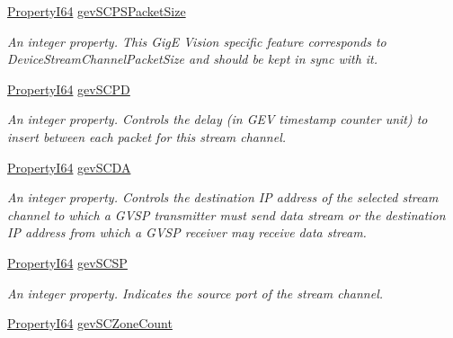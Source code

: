 \begin{DoxyCompactItemize}
\hyperlink{group___common_interface_ga81749b2696755513663492664a18a893}{Property\+I64} \hyperlink{classmv_i_m_p_a_c_t_1_1acquire_1_1_gen_i_cam_1_1_transport_layer_control_a9aaa69a850d9a3a92fd5d59ef48239af}{gev\+S\+C\+P\+S\+Packet\+Size}
\begin{DoxyCompactList}\small\item\em An integer property. This Gig\+E Vision specific feature corresponds to Device\+Stream\+Channel\+Packet\+Size and should be kept in sync with it. \end{DoxyCompactList}\item 
\hyperlink{group___common_interface_ga81749b2696755513663492664a18a893}{Property\+I64} \hyperlink{classmv_i_m_p_a_c_t_1_1acquire_1_1_gen_i_cam_1_1_transport_layer_control_a9364b85c25a2b2bb7f9e56a3076ee1be}{gev\+S\+C\+P\+D}
\begin{DoxyCompactList}\small\item\em An integer property. Controls the delay (in G\+E\+V timestamp counter unit) to insert between each packet for this stream channel. \end{DoxyCompactList}\item 
\hyperlink{group___common_interface_ga81749b2696755513663492664a18a893}{Property\+I64} \hyperlink{classmv_i_m_p_a_c_t_1_1acquire_1_1_gen_i_cam_1_1_transport_layer_control_a06a3fafd41f32d5d6c1d84aeecee87ea}{gev\+S\+C\+D\+A}
\begin{DoxyCompactList}\small\item\em An integer property. Controls the destination I\+P address of the selected stream channel to which a G\+V\+S\+P transmitter must send data stream or the destination I\+P address from which a G\+V\+S\+P receiver may receive data stream. \end{DoxyCompactList}\item 
\hyperlink{group___common_interface_ga81749b2696755513663492664a18a893}{Property\+I64} \hyperlink{classmv_i_m_p_a_c_t_1_1acquire_1_1_gen_i_cam_1_1_transport_layer_control_af936593b12edc0f7b88b108044502eff}{gev\+S\+C\+S\+P}
\begin{DoxyCompactList}\small\item\em An integer property. Indicates the source port of the stream channel. \end{DoxyCompactList}\item 
\hyperlink{group___common_interface_ga81749b2696755513663492664a18a893}{Property\+I64} \hyperlink{classmv_i_m_p_a_c_t_1_1acquire_1_1_gen_i_cam_1_1_transport_layer_control_a6081d6029229cc73075f5d58f1c2da91}{gev\+S\+C\+Zone\+Count}

\end{DoxyCompactItemize}
